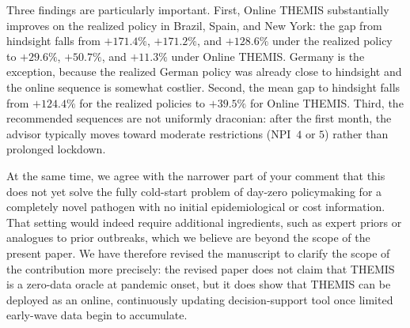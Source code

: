 \documentclass[letterpaper,twoside,11pt]{reviewresponse}
\begin{document}
Three findings are particularly important. First, Online THEMIS substantially improves on the realized policy in Brazil, Spain, and New York: the gap from hindsight falls from $+171.4\%$, $+171.2\%$, and $+128.6\%$ under the realized policy to $+29.6\%$, $+50.7\%$, and $+11.3\%$ under Online THEMIS. Germany is the exception, because the realized German policy was already close to hindsight and the online sequence is somewhat costlier. Second, the mean gap to hindsight falls from $+124.4\%$ for the realized policies to $+39.5\%$ for Online THEMIS. Third, the recommended sequences are not uniformly draconian: after the first month, the advisor typically moves toward moderate restrictions (NPI~$4$ or $5$) rather than prolonged lockdown.

At the same time, we agree with the narrower part of your comment that this does not yet solve the fully cold-start problem of day-zero policymaking for a completely novel pathogen with no initial epidemiological or cost information. That setting would indeed require additional ingredients, such as expert priors or analogues to prior outbreaks, which we believe are beyond the scope of the present paper. We have therefore revised the manuscript to clarify the scope of the contribution more precisely: the revised paper does not claim that THEMIS is a zero-data oracle at pandemic onset, but it does show that THEMIS can be deployed as an online, continuously updating decision-support tool once limited early-wave data begin to accumulate.
\end{document}
